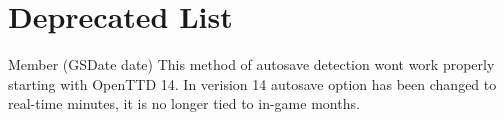 \chapter{Deprecated List}
\hypertarget{deprecated}{}\label{deprecated}

\begin{DoxyRefList}
\item[Member \doxylink{class_idle_util_a3b8c37a9fa296d4d7873388b03ecfdce}{Idle\+Util\+::Is\+Autosave\+Date} (GSDate date)]\label{deprecated__deprecated000001}%
%
This method of autosave detection won\textquotesingle{}t work properly starting with Open\+TTD 14. In verision 14 autosave option has been changed to real-\/time minutes, it is no longer tied to in-\/game months.
\end{DoxyRefList}